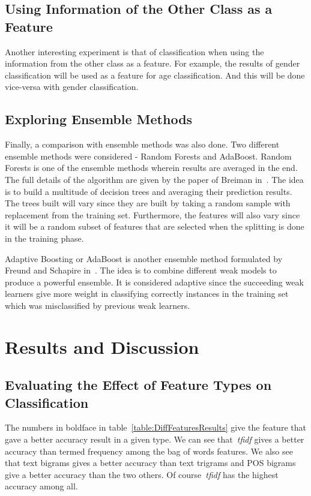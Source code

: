 \documentclass[a4paper]{llncs}
\begin{document}
\subsection{Using Information of the Other Class as a Feature}
Another interesting experiment is that of classification when using the information from the other class as a feature. For example, the results of gender classification will be used as a feature for age classification. And this will be done vice-versa with gender classification.  


\subsection{Exploring Ensemble Methods}
Finally, a comparison with ensemble methods was also done. Two different ensemble methods were considered - Random Forests and AdaBoost. Random Forests is one of the ensemble methods wherein results are averaged in the end. The full details of the algorithm are given by the paper of Breiman in~\cite{breiman2001random}. The idea is to build a multitude of decision trees and averaging their prediction results. The trees built will vary since they are built by taking a random sample with replacement from the training set. Furthermore, the features will also vary since it will be a random subset of features that are selected when the splitting is done in the training phase. 

Adaptive Boosting or AdaBoost is another ensemble method formulated by Freund and Schapire in~\cite{freund1997decision}. The idea is to combine different weak models to produce a powerful ensemble. It is considered adaptive since the succeeding weak learners give more weight in classifying correctly instances in the training set which was misclassified by previous weak learners. 

\section{Results and Discussion}
\subsection{Evaluating the Effect of Feature Types on Classification}
The numbers in boldface in table~\ref{table:DiffFeaturesResults} give the feature that gave a better accuracy result in a given type. We can see that~\textit{tfidf} gives a better accuracy than termed frequency among the bag of words features. We also see that text bigrams gives a better accuracy than text trigrams and POS bigrams give a better accuracy than the two others. Of course~\textit{tfidf} has the highest accuracy among all. 
\end{document}
